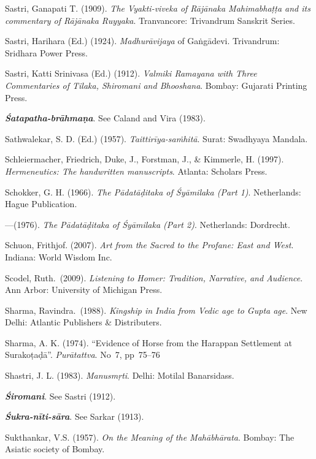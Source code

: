 \begin{thebibliography}{99}
Sastri, Ganapati T. (1909). {\sl The Vyakti-viveka of Rājānaka Mahimabhaṭṭa and its commentary of Rājānaka Ruyyaka}. Tranvancore: Trivandrum Sanskrit Series. 

Sastri, Harihara (Ed.) (1924). {\sl Madhurāvijaya} of Gaṅgādevi. Trivandrum: Sridhara Power Press. 

Sastri, Katti Srinivasa (Ed.) (1912). {\sl Valmiki Ramayana with Three Commentaries of Tilaka, Shiromani and Bhooshana}. Bombay: Gujarati Printing Press.

{\sl\bfseries Śatapatha-brāhmaṇa}. See Caland and Vira (1983).

Sathwalekar, S. D. (Ed.) (1957). {\sl Taittirīya-saṁhitā}. Surat: Swadhyaya Mandala.

Schleiermacher, Friedrich, Duke, J., Forstman, J., \& Kimmerle, H. (1997). {\sl Hermeneutics: The handwritten manuscripts}. Atlanta: Scholars Press.  

Schokker, G. H. (1966). {\sl The Pādatāḍitaka of Śyāmilaka (Part 1)}. Netherlands: Hague Publication. 

---\kern3pt(1976). {\sl The Pādatāḍitaka of Śyāmilaka (Part 2)}. Netherlands: Dordrecht. 

Schuon, Frithjof. (2007). {\sl Art from the Sacred to the Profane: East and West}. Indiana: World Wisdom Inc. 

Scodel, Ruth.\ (2009). {\sl Listening to Homer: Tradition, Narrative, and Audience}. Ann Arbor: University of Michigan Press. 

Sharma, Ravindra.\ (1988). {\sl Kingship in India from Vedic age to Gupta age}. New Delhi: Atlantic Publishers \& Distributers. 

Sharma, A. K. (1974). “Evidence of Horse from the Harappan Settlement at Surakoṭaḍā”. {\sl Purātattva}. No~7, pp~75--76

Shastri, J. L. (1983). {\sl Manusmṛti}. Delhi: Motilal Banarsidass. 

{\sl\bfseries Śiromani}. See Sastri (1912).

{\sl\bfseries Śukra-nīti-sāra}. See Sarkar (1913). 

Sukthankar, V.S. (1957). {\sl On the Meaning of the Mahābhārata}. Bombay: The Asiatic society of Bombay. 


\end{thebibliography}
